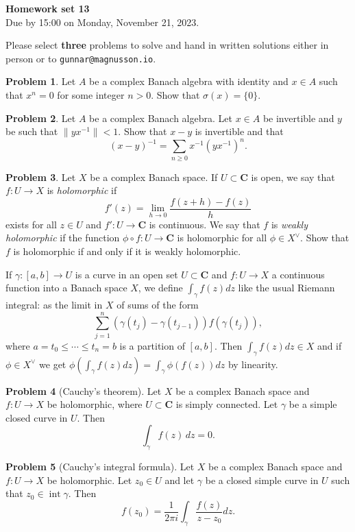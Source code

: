 \documentclass[11pt]{article}
\theoremstyle{definition}
\newtheorem{prob}{Problem}
\newcommand{\kk}[1]{\mathbf{#1}}
\def\head{
\begin{center}
\textbf{\LARGE Homework set 13}
\\[3pt]
Due by 15:00 on Monday, November 21, 2023.
\end{center}
\medskip
}
\begin{document}
\head

Please select \textbf{three} problems to solve and hand in written solutions
either in person or to \verb+gunnar@magnusson.io+.

\begin{prob}
Let $A$ be a complex Banach algebra with identity and $x \in A$ such that $x^n
= 0$ for some integer $n > 0$.
Show that $\sigma(x) = \{ 0 \}$.
\end{prob}

\begin{prob}
Let $A$ be a complex Banach algebra.
Let $x \in A$ be invertible and $y$ be such that $\| y x^{-1} \| < 1$.
Show that $x - y$ is invertible and that
\[
(x - y)^{-1} = \sum_{n \geq 0} x^{-1} (y x^{-1})^n.
\]
\end{prob}

\begin{prob}
Let $X$ be a complex Banach space.
If $U \subset \kk C$ is open, we say that $f : U \to X$ is \emph{holomorphic} if
\[
f'(z) = \lim_{h \to 0} \frac{f(z + h) - f(z)}{h}
\]
exists for all $z \in U$ and $f' : U \to \kk C$ is continuous.
We say that $f$ is \emph{weakly holomorphic} if the
function $\phi \circ f : U \to \kk C$ is holomorphic for all $\phi \in X^\vee$.
Show that $f$ is holomorphic if and only if it is weakly holomorphic.
\end{prob}

If $\gamma : [a, b] \to U$ is a curve in an open set $U \subset \kk C$ and
$f : U \to X$ a continuous function into a Banach space $X$, we define
$\int_\gamma f(z) dz$ like the usual Riemann integral: as the limit in $X$ of
sums of the form
\[
\sum_{j=1}^n (\gamma(t_{j}) - \gamma(t_{j-1})) f(\gamma(t_j)),
\]
where $a = t_0 \leq \cdots \leq t_n = b$ is a partition of $[a,b]$.
Then $\int_\gamma f(z) dz \in X$ and if $\phi \in X^\vee$ we get
$\phi(\int_\gamma f(z) dz) = \int_\gamma \phi(f(z)) dz$ by linearity.

\begin{prob}[Cauchy's theorem]
Let $X$ be a complex Banach space and $f : U \to X$ be holomorphic, where
$U \subset \kk C$ is simply connected.
Let $\gamma$ be a simple closed curve in $U$.
Then
\[
\int_\gamma f(z) \, dz = 0.
\]
\end{prob}

\begin{prob}[Cauchy's integral formula]
Let $X$ be a complex Banach space and $f : U \to X$ be holomorphic.
Let $z_0 \in U$ and let $\gamma$ be a closed simple curve in $U$ such that
$z_0 \in \operatorname{int} \gamma$.
Then
\[
f(z_0) = \frac{1}{2\pi i} \int_\gamma \frac{f(z)}{z - z_0} dz.
\]
\end{prob}
\end{document}
